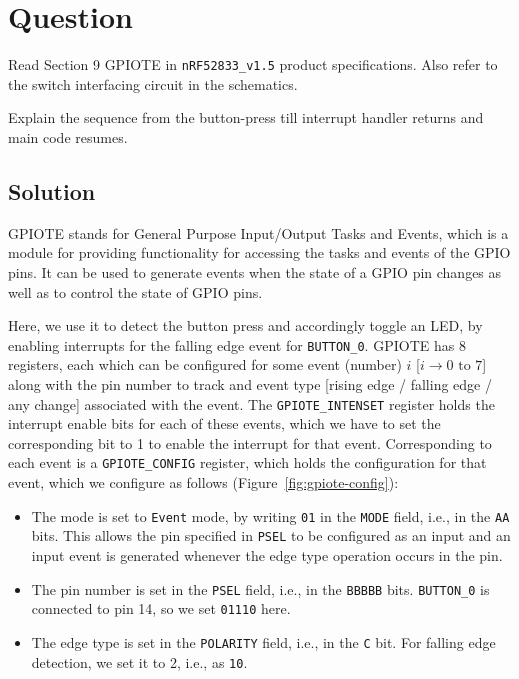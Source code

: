 \section*{Question}

Read Section 9 GPIOTE in \texttt{nRF52833\_v1.5} product specifications.
Also refer to the switch interfacing circuit in the schematics.

Explain the sequence from the button-press till interrupt handler returns and main code resumes.

\vspace*{-2em}
\subsection*{Solution}

GPIOTE stands for General Purpose Input/Output Tasks and Events, which is a module for providing functionality for accessing the tasks and events of the GPIO pins.
It can be used to generate events when the state of a GPIO pin changes as well as to control the state of GPIO pins.

Here, we use it to detect the button press and accordingly toggle an LED, by enabling interrupts for the falling edge event for \texttt{BUTTON\_0}.
GPIOTE has 8 registers, each which can be configured for some event (number) \( i \) [\( i \to 0 \text{ to } 7 \)] along with the pin number to track and event type [rising edge / falling edge / any change] associated with the event.
The \texttt{GPIOTE\_INTENSET} register holds the interrupt enable bits for each of these events, which we have to set the corresponding bit to 1 to enable the interrupt for that event.
Corresponding to each event is a \texttt{GPIOTE\_CONFIG} register, which holds the configuration for that event, which we configure as follows (Figure~\ref{fig:gpiote-config}):
\begin{itemize}[noitemsep, topsep=0pt]
    \item The mode is set to \texttt{Event} mode, by writing \texttt{01} in the \texttt{MODE} field, i.e., in the \texttt{AA} bits.
          This allows the pin specified in \texttt{PSEL} to be configured as an input and an input event is generated whenever the edge type operation occurs in the pin.

    \item The pin number is set in the \texttt{PSEL} field, i.e., in the \texttt{BBBBB} bits.
          \texttt{BUTTON\_0} is connected to pin 14, so we set \texttt{01110} here.

    \item The edge type is set in the \texttt{POLARITY} field, i.e., in the \texttt{C} bit.
          For falling edge detection, we set it to 2, i.e., as \texttt{10}.
\end{itemize}

